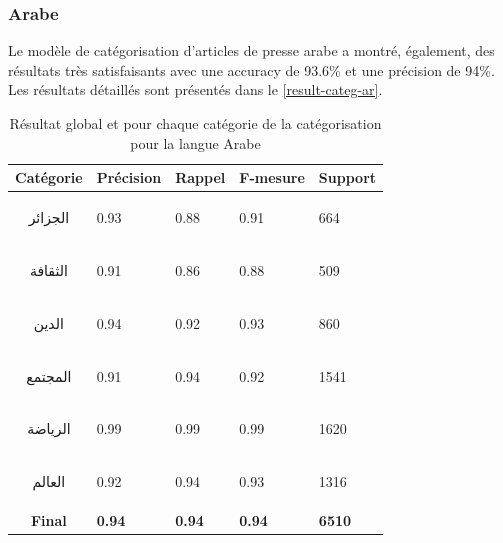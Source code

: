    \subsubsection{Arabe}
    Le modèle de catégorisation d'articles de presse arabe a montré, également, des résultats très satisfaisants avec une accuracy de 93.6\% et une précision de 94\%. Les résultats détaillés sont présentés dans le \autoref{result-categ-ar}.
    \begin{table}[H]
        \begin{center}
            \begin{tabular}{|c|C{2cm}|C{2cm}|C{2cm}|C{2cm}|}
                \hline
                \textbf{Catégorie} &  \textbf{Précision} &  \textbf{Rappel} &  \textbf{F-mesure} &  \textbf{Support} \\
                \hline
                \begin{arab}الجزائر\end{arab} & 0.93 & 0.88 & 0.91 & 664 \\
                \begin{arab}الثقافة\end{arab} & 0.91 & 0.86 & 0.88 & 509 \\
                \begin{arab}الدين\end{arab} & 0.94 & 0.92 & 0.93 & 860 \\
                \begin{arab}المجتمع\end{arab} & 0.91 & 0.94 & 0.92 & 1541 \\
                \begin{arab}الرياضة\end{arab} & 0.99 & 0.99 & 0.99 & 1620 \\
                \begin{arab}العالم\end{arab} & 0.92 & 0.94 & 0.93 & 1316 \\                      
                \textbf{Final} & \textbf{0.94} & \textbf{0.94} & \textbf{0.94} & \textbf{6510} \\
                \hline
            \end{tabular}
        \end{center}
        \caption{Résultat global et pour chaque catégorie de la catégorisation pour la langue Arabe}
        \label{result-categ-ar}
    \end{table}

